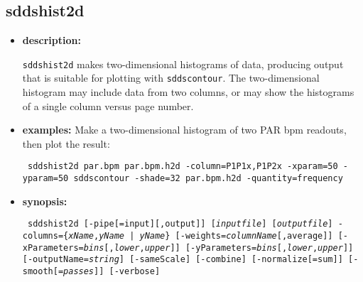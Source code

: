 \newpage

\subsection{sddshist2d}
\label{sddshist2d}

\begin{itemize}
\item {\bf description:}

{\tt sddshist2d} makes two-dimensional histograms of data, producing
output that is suitable for plotting with {\tt sddscontour}.
The two-dimensional histogram may include data from two columns, or may
show the histograms of a single column versus page number.

\item {\bf examples:} 
Make a two-dimensional histogram of two PAR bpm readouts, then plot the result:
\begin{flushleft}{\tt 
sddshist2d par.bpm par.bpm.h2d -column=P1P1x,P1P2x -xparam=50 -yparam=50
sddscontour -shade=32 par.bpm.h2d -quantity=frequency
}
\end{flushleft}

\item {\bf synopsis:} 
\begin{flushleft}{\tt
sddshist2d [-pipe[=input][,output]] [{\em inputfile}] [{\em outputfile}]
-columns=\{{\em xName},{\em yName} | {\em yName}\}
[-weights={\em columnName}[,average]]
[-xParameters={\em bins}[,{\em lower},{\em upper}]] [-yParameters={\em bins}[,{\em lower},{\em upper}]]
[-outputName={\em string}] 
[-sameScale] [-combine] [-normalize[=sum]] [-smooth[={\em passes}]] 
[-verbose] 
}\end{flushleft}


\end{itemize}
